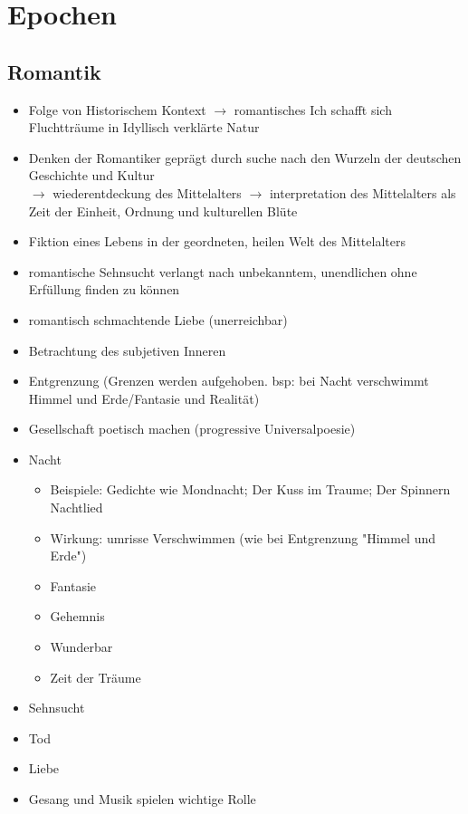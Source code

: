 

%
%

\section{Epochen}

\subsection{Romantik}

\begin{itemize}
    \item Folge von Historischem Kontext $\rightarrow$ romantisches Ich schafft sich Fluchtträume in Idyllisch verklärte Natur
    \item Denken der Romantiker geprägt durch suche nach den Wurzeln der deutschen Geschichte und Kultur \\ 
        $\rightarrow$ wiederentdeckung des Mittelalters
        $\rightarrow$ interpretation des Mittelalters als Zeit der Einheit, Ordnung und kulturellen Blüte
    \item Fiktion eines Lebens in der geordneten, heilen Welt des Mittelalters
    \item romantische Sehnsucht verlangt nach unbekanntem, unendlichen ohne Erfüllung finden zu können
    \item romantisch schmachtende Liebe (unerreichbar)
    \item Betrachtung des subjetiven Inneren
    \item Entgrenzung (Grenzen werden aufgehoben. bsp: bei Nacht verschwimmt Himmel und Erde/Fantasie und Realität)
    \item Gesellschaft poetisch machen (progressive Universalpoesie)
\end{itemize}

\begin{itemize}
    \item Nacht 
        \begin{itemize}
            \item Beispiele: Gedichte wie Mondnacht; Der Kuss im Traume; Der Spinnern Nachtlied
            \item Wirkung: umrisse Verschwimmen (wie bei Entgrenzung "Himmel und Erde")
            \item Fantasie
            \item Gehemnis
            \item Wunderbar
            \item Zeit der Träume
        \end{itemize}
    \item Sehnsucht
    \item Tod
    \item Liebe
    \item Gesang und Musik spielen wichtige Rolle
\end{itemize}

